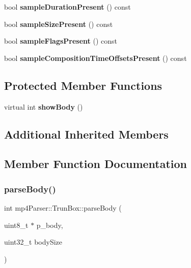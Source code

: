 \begin{DoxyCompactItemize}
\item 
\mbox{\label{classmp4_parser_1_1_trun_box_a9ddb52f2e6f243beabc2ce371e0fb3c9}} 
bool {\bfseries sample\+Duration\+Present} () const
\item 
\mbox{\label{classmp4_parser_1_1_trun_box_a26e0205d5e088dad88fd9b71a808dca4}} 
bool {\bfseries sample\+Size\+Present} () const
\item 
\mbox{\label{classmp4_parser_1_1_trun_box_acb2dad8a878a9a9e872552762ace1f8b}} 
bool {\bfseries sample\+Flags\+Present} () const
\item 
\mbox{\label{classmp4_parser_1_1_trun_box_a8f3946be8688eaff1948ee4d6103c1db}} 
bool {\bfseries sample\+Composition\+Time\+Offsets\+Present} () const
\end{DoxyCompactItemize}
\subsection*{Protected Member Functions}
\begin{DoxyCompactItemize}
\item 
\mbox{\label{classmp4_parser_1_1_trun_box_abb97971cfb927c15769a843638946305}} 
virtual int {\bfseries show\+Body} ()
\end{DoxyCompactItemize}
\subsection*{Additional Inherited Members}


\subsection{Member Function Documentation}
\mbox{\label{classmp4_parser_1_1_trun_box_ac17bd64107ffbada335874e12d8a8a25}} 
\subsubsection{\texorpdfstring{parseBody()}{parseBody()}}
{\footnotesize\ttfamily int mp4\+Parser\+::\+Trun\+Box\+::parse\+Body (\begin{DoxyParamCaption}\item[{uint8\+\_\+t $\ast$}]{p\+\_\+body,  }\item[{uint32\+\_\+t}]{body\+Size }\end{DoxyParamCaption})\hspace{0.3cm}{\ttfamily [virtual]}}



